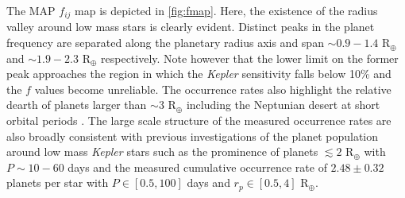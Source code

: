 \documentclass[twocolumn]{emulateapj}
\newcommand{\kepler}[1]{\emph{Kepler}#1}
\begin{document}
The MAP $f_{ij}$ map is depicted in \autoref{fig:fmap}.
Here, the existence of the radius valley around low mass stars is clearly
evident. Distinct peaks in the planet frequency are separated along the planetary radius axis and span
$\sim 0.9-1.4$ R$_{\oplus}$ and $\sim 1.9-2.3$ R$_{\oplus}$ respectively.
Note however that the lower limit on the former peak 
approaches the region in which the \kepler{} sensitivity falls below 10\% and the $f$ values become
unreliable.
The occurrence rates also highlight the relative dearth of planets larger than $\sim 3$ R$_{\oplus}$
including the Neptunian desert at short orbital periods \citep{lundkvist16,mazeh16}. The large scale
structure of the measured occurrence rates are also broadly consistent with previous investigations
of the planet population around low mass \kepler{} stars \citep{morton14,dressing15a,gaidos16} such
as the prominence of planets $\lesssim 2$ R$_{\oplus}$ with $P \sim 10-60$ days and the measured
cumulative occurrence rate of $2.48\pm 0.32$ planets per star with $P\in [0.5,100]$ days and
$r_p\in [0.5,4]$ R$_{\oplus}$.
\end{document}

